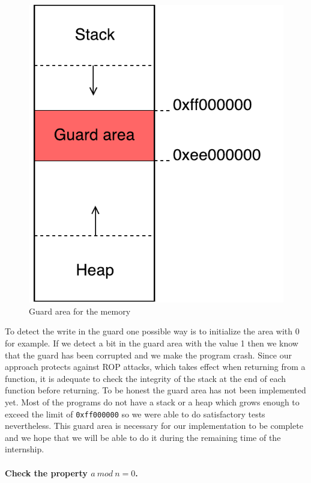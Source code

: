 \documentclass[11pt]{sdm}
\begin{document}
\begin{figure}[!ht]
\centering
\includegraphics[scale=0.6]{images/guard.pdf}
\caption{Guard area for the memory}
\label{guard}
\end{figure}

To detect the write in the guard one possible way is to initialize the area with 0 for example. If we detect a bit in the guard area with the value 1 then we know that the guard has been corrupted and we make the program crash. Since our approach protects against ROP attacks, which takes effect when returning from a function, it is adequate to check the integrity of the stack at the end of each function before returning.
To be honest the guard area has not been implemented yet. Most of the programs do not have a stack or a heap which grows enough to exceed the limit of \texttt{0xff000000} so we were able to do satisfactory tests nevertheless. This guard area is necessary for our implementation to be complete and we hope that we will be able to do it during the remaining time of the internship.

\paragraph{Check the property $a~mod~n=0$.}
\label{par:Classic check}
 
\end{document}
